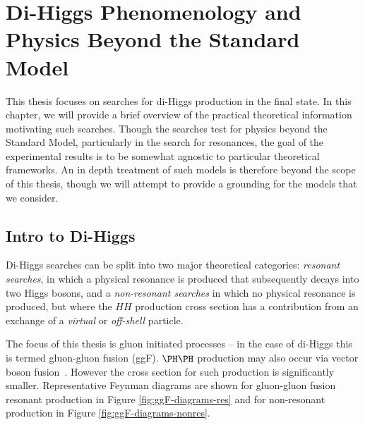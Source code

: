 \chapter{Di-Higgs Phenomenology and Physics Beyond the Standard Model}
\label{chap:hh-bsm}
This thesis focuses on searches for di-Higgs production in the \bbbb final state. In this chapter,
we will provide a brief overview of the practical theoretical information motivating such searches. 
Though the searches test for physics beyond the Standard Model, particularly in the search for 
resonances, the goal of the experimental results is to be somewhat agnostic to particular 
theoretical frameworks. An in depth treatment of such models is therefore beyond the scope 
of this thesis, though we will attempt to provide a grounding for the models that we consider.

\section{Intro to Di-Higgs}
Di-Higgs searches can be split into two major theoretical categories: \emph{resonant searches}, in which a physical resonance is produced that subsequently decays into two Higgs bosons, and a \emph{non-resonant searches} in which no physical resonance is produced, but where the $HH$ production cross section has a contribution from an exchange of a \emph{virtual} or \emph{off-shell} particle. 

The focus of this thesis is gluon initiated processes -- in the case of di-Higgs this is termed gluon-gluon fusion
(ggF). $\higgs\higgs$ production may also occur via vector boson fusion~\cite{HDBS-2018-18}. However the cross section for such production is significantly smaller. Representative Feynman diagrams are shown for gluon-gluon fusion 
resonant production in Figure \ref{fig:ggF-diagrams-res} and for non-resonant production in 
Figure \ref{fig:ggF-diagrams-nonres}.

